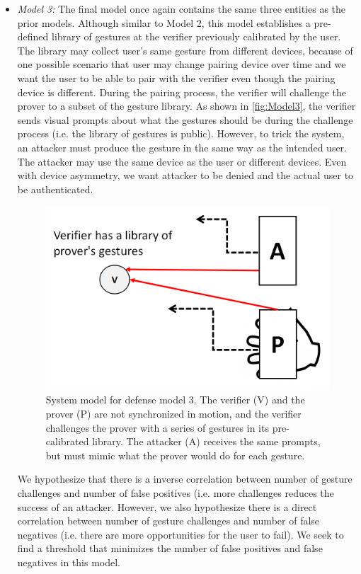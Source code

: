 \begin{itemize}
\item \emph{Model 3:} The final model once again contains the same three entities as the prior models. Although similar to Model 2, this model establishes a pre-defined library of gestures at the verifier previously calibrated by the user. The library may collect user's same gesture from different devices, because of one possible scenario that user may change pairing device over time and we want the user to be able to pair with the verifier even though the pairing device is different. During the pairing process, the verifier will challenge the prover to a subset of the gesture library. As shown in \autoref{fig:Model3}, the verifier sends visual prompts about what the gestures should be during the challenge process (i.e. the library of gestures is public). However, to trick the system, an attacker must produce the gesture in the same way as the intended user. The attacker may use the same device as the user or different devices. Even with device asymmetry, we want attacker to be denied and the actual user to be authenticated. 

\begin{figure}[!tb]
\centering
\includegraphics[width=0.65 \linewidth]{./figures/model3.png}
\caption{System model for defense model 3. The verifier (V) and the prover (P) are not synchronized in motion, and the verifier challenges the prover with a series of gestures in its pre-calibrated library. The attacker (A) receives the same prompts, but must mimic what the prover would do for each gesture.}
\label{fig:Model3}
\end{figure}

We hypothesize that there is a inverse correlation between number of gesture challenges and number of false positives (i.e. more challenges reduces the success of an attacker. However, we also hypothesize there is a direct correlation between number of gesture challenges and number of false negatives (i.e. there are more opportunities for the user to fail). We seek to find a threshold that minimizes the number of false positives and false negatives in this model.

\end{itemize}

